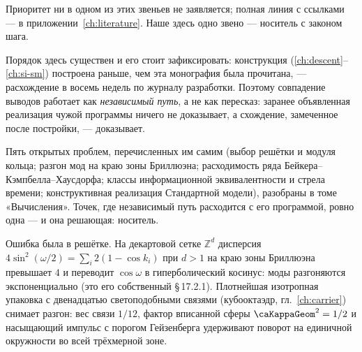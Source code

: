 Приоритет ни в одном из этих звеньев не заявляется; полная линия с ссылками ---
в приложении~\ref{ch:literature}. Наше здесь одно звено --- носитель с законом шага.

Порядок здесь существен и его стоит зафиксировать: конструкция (\cref{ch:descent}--\cref{ch:si-sm})
построена раньше, чем эта монография была прочитана, --- расхождение в восемь недель по
журналу разработки. Поэтому совпадение выводов работает как \emph{независимый путь},
а не как пересказ: заранее объявленная реализация чужой программы ничего не доказывает,
а схождение, замеченное после постройки, --- доказывает.

Пять открытых проблем, перечисленных им самим (выбор решётки и модуля кольца;
разгон мод на краю зоны Бриллюэна; расходимость ряда Бейкера--Кэмпбелла--Хаусдорфа;
классы информационной эквивалентности и стрела времени; конструктивная реализация
Стандартной модели), разобраны в томе «Вычисления».
Точек, где независимый путь расходится с его программой, ровно одна --- и она решающая:
носитель.

Ошибка была в решётке. На декартовой сетке $\mathbb{Z}^d$ дисперсия
$4\sin^2(\omega/2)=\sum_i 2(1-\cos k_i)$ при $d>1$ на краю зоны Бриллюэна
превышает $4$ и переводит $\cos\omega$ в гиперболический косинус: моды разгоняются
экспоненциально (это его собственный \S\,17.2.1).
Плотнейшая изотропная упаковка с двенадцатью светоподобными связями
(кубооктаэдр, гл.~\ref{ch:carrier}) снимает разгон: вес связи $1/12$,
фактор вписанной сферы $\caKappaGeom^2=1/2$ и насыщающий импульс с порогом
Гейзенберга удерживают поворот на единичной окружности во всей трёхмерной зоне.

